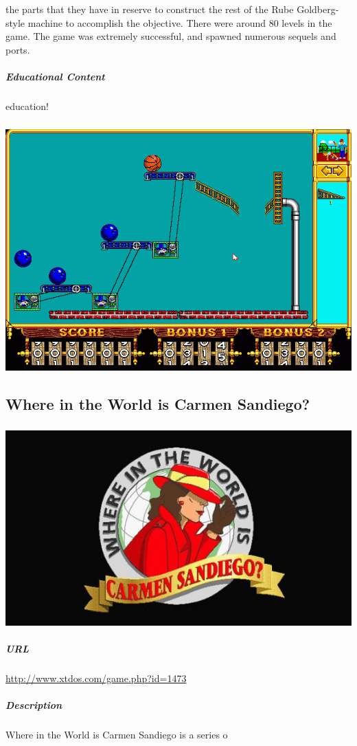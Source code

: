  the parts that they have in reserve to construct the rest of the Rube Goldberg-style machine to accomplish the objective. There were around 80 levels in the game. The game was extremely successful, and spawned numerous sequels and ports.\subparagraph{Educational Content}education!\subparagraph{}\includegraphics[width = \textwidth]{img/machine_screen.png}\newpage\subsection{Where in the World is Carmen Sandiego?}\subparagraph{}\includegraphics[width = \textwidth]{img/carmen_title.jpg}\subparagraph{URL}\url{http://www.xtdos.com/game.php?id=1473}\subparagraph{Description}Where in the World is Carmen Sandiego is a series o
